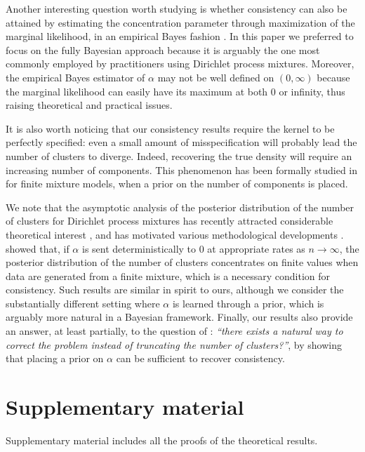 \documentclass[12pt]{article}
\begin{document}
Another interesting question worth studying is whether consistency can also be attained by estimating the concentration parameter through maximization of the marginal likelihood, in an empirical Bayes fashion \citep{Liu1996,McAuliffe2006}.
In this paper we preferred to focus on the fully Bayesian approach because it is arguably the one  %
most commonly employed by practitioners using Dirichlet process mixtures.
Moreover, the empirical Bayes estimator of $\alpha$ may not be well defined on $(0,\infty)$ because the marginal likelihood can easily have its maximum at both $0$ or infinity, thus raising theoretical and practical issues.

It is also worth noticing that our consistency results require the kernel to be perfectly specified: even a small amount of misspecification will probably lead the number of clusters to diverge. Indeed, recovering the true density will require an increasing number of components. This phenomenon has been formally studied in \cite{Cai2020} for finite mixture models, when a prior on the number of components is placed.


We note that the asymptotic analysis of the posterior distribution of the number of clusters for Dirichlet process mixtures has recently attracted considerable theoretical interest \citep{Yang2019,Ohn2020,Cai2020}, and has motivated various methodological developments \citep{Miller2017,Zeng2020}. \cite{Ohn2020} showed that, if $\alpha$ is sent deterministically to 0 at appropriate rates as $n\to\infty$, the posterior distribution of the number of clusters concentrates on finite values when data are generated from a finite mixture, which is a necessary condition for consistency.  Such results are similar in spirit to ours, although we consider the substantially different setting where $\alpha$ is learned through a prior, which is arguably more natural in a Bayesian framework. 
Finally, our results also provide an answer, at least partially, to the question of \cite{Yang2019}: \emph{``there exists a natural way to correct the problem instead of truncating the number of clusters?''}, by showing that placing a prior on $\alpha$ can be sufficient to recover consistency. 

\section*{Supplementary material}
Supplementary material includes all the proofs of the theoretical results.



\end{document}
